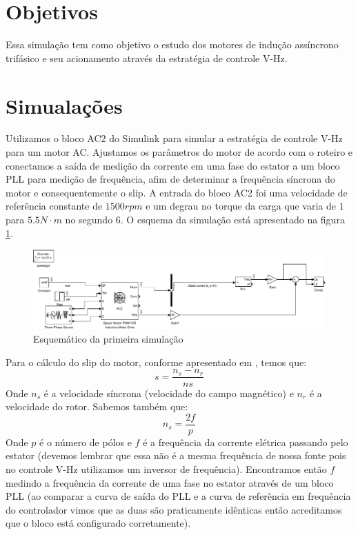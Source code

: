 \documentclass{article}
\begin{document}


\onehalfspacing
\section{Objetivos}
	Essa simulação tem como objetivo o estudo dos motores de indução assíncrono trifásico e seu acionamento através da estratégia de controle V-Hz.
	 
\section{Simualações}
Utilizamos o bloco AC2 do Simulink para simular a estratégia de controle V-Hz para um motor AC. Ajustamos os parâmetros do motor de acordo com o roteiro e conectamos a saída de medição da corrente em uma fase do estator a um bloco PLL para medição de frequência, afim de determinar a frequência síncrona do motor e consequentemente o slip. A entrada do bloco AC2 foi uma velocidade de referência constante de $1500 rpm$ e um degrau no torque da carga que varia de $1$ para $5.5 N\cdot m$ no segundo 6. O esquema da simulação está apresentado na figura \ref{fig:sim1}.
\begin{figure}[H]
	\centering
	\includegraphics[width=\linewidth]{matlab/sim1}
	\caption{Esquemático da primeira simulação}
	\label{fig:sim1}
\end{figure}

Para o cálculo do slip do motor, conforme apresentado em \cite{bb:learneng}, temos que:
\begin{equation}
	s = \frac{n_s - n_r}{ns}
\end{equation}
Onde $n_s$ é a velocidade síncrona (velocidade do campo magnético) e $n_r$ é a velocidade do rotor.
Sabemos também que:
\begin{equation}
	n_s = \frac{2f}{p}
\end{equation}
Onde $p$ é o número de pólos e $f$ é a frequência da corrente elétrica passando pelo estator (devemos lembrar que essa não é a mesma frequência de nossa fonte pois no controle V-Hz utilizamos um inversor de frequência). Encontramos então $f$ medindo a frequência da corrente de uma fase no estator através de um bloco PLL (ao comparar a curva de saída do PLL e a curva de referência em frequência do controlador vimos que as duas são praticamente idênticas então acreditamos que o bloco está configurado corretamente).
\end{document}
